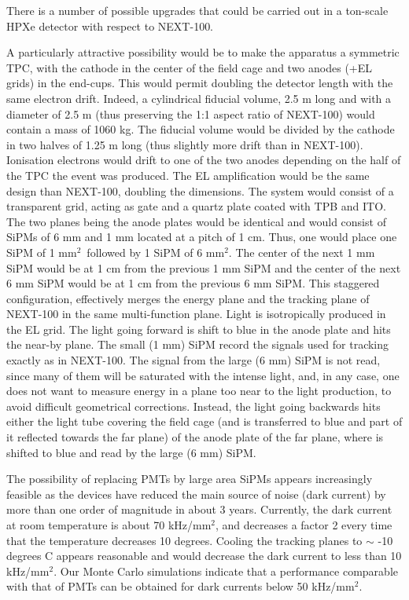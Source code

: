 There is a number of possible upgrades that could be carried out in a ton-scale HPXe detector with respect to NEXT-100. 

A particularly attractive possibility would be to make the apparatus a symmetric TPC, with the cathode in the center of the field cage and two anodes (+EL grids) in the end-cups. This would permit doubling the detector length with the same electron drift. Indeed, a cylindrical fiducial volume, 2.5 m long and with a diameter of 2.5 m (thus preserving the 1:1 aspect ratio of NEXT-100) would contain a mass of 1060 kg. The fiducial volume would be divided by the cathode in two halves of 1.25 m long (thus slightly more drift than in NEXT-100). Ionisation electrons would drift to one of the two anodes depending on the half of the TPC the event was produced. The EL amplification would be the same design than NEXT-100, doubling the dimensions. The system would consist of a transparent grid, acting as gate and a quartz plate coated with TPB and ITO. The two planes being the anode plates would be identical and would consist of SiPMs of 6 mm and 1 mm located at a pitch of 1 cm. Thus, one would place one SiPM of 1 mm$^2$~followed by 1 SiPM of 6 mm$^2$. The center of the next 1 mm SiPM would be at 1 cm from the previous 1 mm SiPM and the center of the next 6 mm SiPM would be at 1 cm from the previous 6 mm SiPM. This staggered configuration, effectively merges the energy plane and the tracking plane of NEXT-100 in the same multi-function plane. Light is isotropically produced in the EL grid. The light going forward is shift to blue in the anode plate and hits the near-by plane. The small (1 mm) SiPM record the signals used for tracking exactly as in NEXT-100. The signal from the large (6 mm) SiPM is not read, since many of them will be saturated with the intense light, and, in any case, one does not want to measure energy in a plane too near to the light production, to avoid difficult geometrical corrections. Instead, the light going backwards hits either the light tube covering the field cage (and is transferred to blue and part of it reflected towards the far plane) of the anode plate of the far plane, where is shifted to blue and read by the large (6 mm) SiPM. 

The possibility of replacing PMTs by large area SiPMs appears increasingly feasible as the devices have reduced the main source of noise (dark current) by more than one order of magnitude in about 3 years. Currently, the dark current at room temperature is about 70 kHz/mm$^2$, and decreases a factor 2 every time that the temperature decreases 10 degrees. Cooling the tracking planes to $\sim$ -10 degrees C appears reasonable and would decrease the dark current to less than 10 kHz/mm$^2$. Our Monte Carlo simulations indicate that a performance comparable with that of PMTs can be obtained for dark currents below
50 kHz/mm$^2$.  

